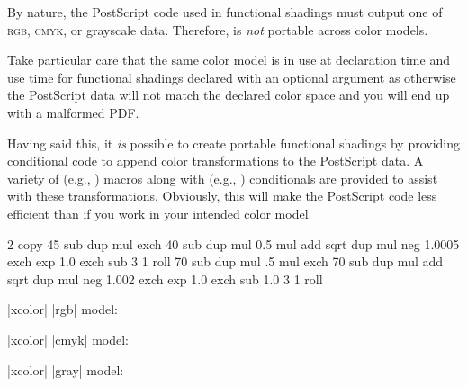 By nature, the PostScript code used in functional shadings must output one of
\textsc{rgb}, \textsc{cmyk}, or grayscale data. Therefore,
 is \emph{not} portable across color models.

Take particular care that the same color model is in use at declaration time
and use time for functional shadings declared with an optional argument as
otherwise the PostScript data will not match the declared color space and
you will end up with a malformed PDF.

Having said this, it \emph{is} possible to create portable functional shadings
by providing conditional code to append color transformations to the
PostScript data. A variety of  (e.g.,
) macros along with  (e.g.,
) conditionals are provided to assist with these
transformations. Obviously, this will make the PostScript code less efficient
than if you work in your intended color model.

    {\pgfpointorigin}{\pgfpoint{3.5cm}{3.5cm}}{}{
  2 copy
  45 sub dup mul exch
  40 sub dup mul 0.5 mul add sqrt
  dup mul neg 1.0005 exch exp 1.0 exch sub
  3 1 roll
  70 sub dup mul .5 mul exch
  70 sub dup mul add sqrt
  dup mul neg 1.002 exch exp 1.0 exch sub
  1.0 3 1 roll
  \ifpgfshadingmodelcmyk
    \pgffuncshadingrgbtocmyk
  \fi
  \ifpgfshadingmodelgray
    \pgffuncshadingrgbtogray
  \fi
}
\begin{center}
  \begin{minipage}{3.5cm}
    |xcolor| |rgb| model:\medskip

  \end{minipage}\hspace{2cm}
  \begin{minipage}{3.5cm}
    |xcolor| |cmyk| model:\medskip

  \end{minipage}\hspace{2cm}
  \begin{minipage}{3.5cm}
    |xcolor| |gray| model:\medskip

  \end{minipage}
\end{center}

\begin{codeexample}
\end{codeexample}


